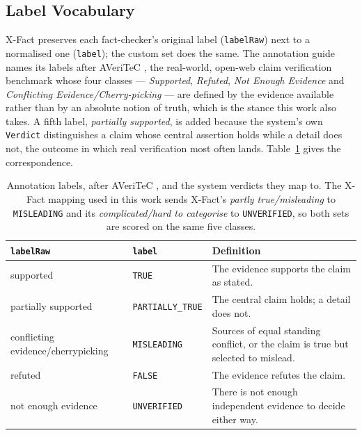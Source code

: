 
\subsection{Label Vocabulary}
\label{subsec:custom-labels}

X-Fact preserves each fact-checker's original label
(\texttt{labelRaw}) next to a normalised one (\texttt{label}); the
custom set does the same. The annotation guide names its labels after
AVeriTeC \cite{schlichtkrull2023averitec}, the real-world,
open-web claim verification benchmark whose four classes ---
\emph{Supported}, \emph{Refuted}, \emph{Not Enough Evidence} and
\emph{Conflicting Evidence/Cherry-picking} --- are defined by the
evidence available rather than by an absolute notion of truth, which
is the stance this work also takes. A fifth label,
\emph{partially supported}, is added because the system's own
\texttt{Verdict} distinguishes a claim whose central assertion holds
while a detail does not, the outcome in which real verification most
often lands. Table~\ref{tab:custom-labels} gives the correspondence.

\begin{table}[ht]
\centering
\small
\begin{tabularx}{\linewidth}{@{}llX@{}}
\toprule
\textbf{\texttt{labelRaw}} & \textbf{\texttt{label}} &
\textbf{Definition} \\
\midrule
supported & \texttt{TRUE} & The evidence supports the claim as
stated. \\
partially supported & \texttt{PARTIALLY\_TRUE} & The central claim
holds; a detail does not. \\
conflicting evidence/cherrypicking & \texttt{MISLEADING} & Sources
of equal standing conflict, or the claim is true but selected to
mislead. \\
refuted & \texttt{FALSE} & The evidence refutes the claim. \\
not enough evidence & \texttt{UNVERIFIED} & There is not enough
independent evidence to decide either way. \\
\bottomrule
\end{tabularx}
\caption{Annotation labels, after AVeriTeC
\cite{schlichtkrull2023averitec}, and the system verdicts they map
to. The X-Fact mapping used in this work sends X-Fact's
\emph{partly true/misleading} to \texttt{MISLEADING} and its
\emph{complicated/hard to categorise} to \texttt{UNVERIFIED}, so both
sets are scored on the same five classes.}
\label{tab:custom-labels}
\end{table}
